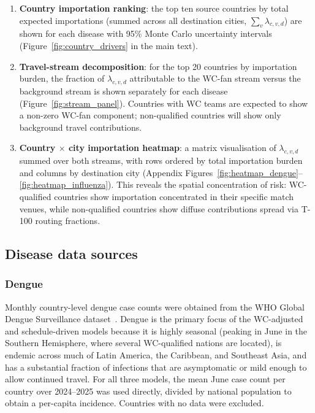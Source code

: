 \documentclass[12pt]{article}
\begin{document}
\begin{enumerate}
  \item \textbf{Country importation ranking}: the top ten source
    countries by total expected importations (summed across all
    destination cities, $\sum_v \lambda_{c,v,d}$) are shown for each
    disease with 95\% Monte Carlo uncertainty intervals
    (Figure~\ref{fig:country_drivers} in the main text).

  \item \textbf{Travel-stream decomposition}: for the top 20
    countries by importation burden, the fraction of
    $\lambda_{c,v,d}$ attributable to the WC-fan stream
    versus the background stream is shown separately for each disease
    (Figure~\ref{fig:stream_panel}).
    Countries with WC teams are expected to show a non-zero WC-fan
    component; non-qualified countries will show only background travel
    contributions.

  \item \textbf{Country $\times$ city importation heatmap}: a matrix
    visualisation of $\lambda_{c,v,d}$ summed over both streams,
    with rows ordered by total importation burden and columns by
    destination city (Appendix Figures~\ref{fig:heatmap_dengue}--\ref{fig:heatmap_influenza}).
    This reveals the spatial concentration of risk: WC-qualified
    countries show importation concentrated in their specific match
    venues, while non-qualified countries show diffuse contributions
    spread via T-100 routing fractions.
\end{enumerate}

\subsection*{Disease data sources}

\subsubsection*{Dengue}

Monthly country-level dengue case counts were obtained from the WHO
Global Dengue Surveillance dataset~\cite{WHO_dengue}. Dengue
is the primary focus of the WC-adjusted and schedule-driven models
because it is highly seasonal (peaking in June in the Southern
Hemisphere, where several WC-qualified nations are located), is
endemic across much of Latin America, the Caribbean, and Southeast
Asia, and has a substantial fraction of infections that are
asymptomatic or mild enough to allow continued travel. For all three models, the mean June case count per country over
2024--2025 was used directly, divided by national population to
obtain a per-capita incidence. Countries with no data were excluded.
\end{document}
